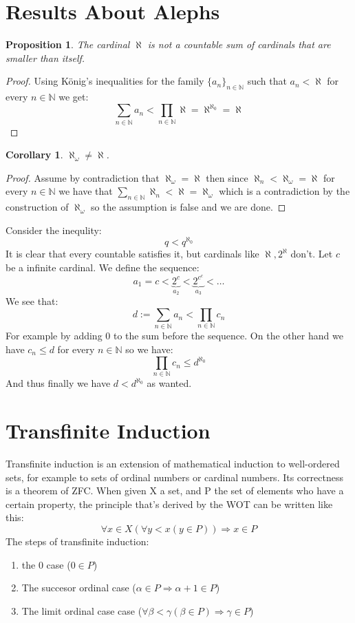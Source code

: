 \documentclass{article}
\newcommand{\N}{\mathbb{N}}
\theoremstyle{plain}
\newtheorem{proposition}[theorem]{Proposition}
\newtheorem{corollary}[theorem]{Corollary}
\begin{document}
	\section*{Results About Alephs}
	\begin{proposition}
		The cardinal $\aleph$ is not a countable sum of cardinals that are
		smaller than itself.
	\end{proposition}
	\begin{proof}
		Using König's inequalities for the family $\{a_n\}_{n \in \N}$ such
		that $a_n < \aleph$ for every $n \in \N$ we get:
		\[
			\sum_{n\in\N}{a_n} < \prod_{n\in\N}{\aleph} = \aleph^{\aleph_0}
			= \aleph
		\]
	\end{proof}
	\begin{corollary}
		$\aleph_\omega \neq \aleph$.
	\end{corollary}
	\begin{proof}
		Assume by contradiction that $\aleph_\omega = \aleph$ then since
		$\aleph_n < \aleph_\omega = \aleph $ for every $n \in \N$ we have 
		that $\sum_{n\in\N}{\aleph_n} < \aleph = \aleph_\omega$ which is
		a contradiction by the construction of $\aleph_\omega$ so the
		assumption is false and we are done.
	\end{proof}
	\noindent Consider the inequlity:
	\[
		q < q^{\aleph_0}
	\]
	It is clear that every countable satisfies it, but cardinals like
	$\aleph,2^\aleph$ don't. Let $c$ be a infinite cardinal. We define
	the sequence:
	\[
		a_1 = c < \underbrace{2^c}_{a_2} < \underbrace{2^{c^c}}_{a_3} < \dots
	\]
	We see that:
	\[
		d := \sum_{n \in \N}{a_n} < \prod_{n \in \N}{c_n}
	\]
	For example by adding $0$ to the sum before the sequence. On the other
	hand we have $c_n \le d$ for every $n \in \N$ so we have:
	\[
		\prod_{n \in \N}{c_n} \le d^{\aleph_0}
	\]
	And thus finally we have $d < d^{\aleph_0}$ as wanted.

\newpage
\section{Transfinite Induction}
Transfinite induction is an extension of mathematical induction to well-ordered
sets, for example to sets of ordinal numbers or cardinal numbers. Its 
correctness is a theorem of ZFC. When given X a set, and P the set of 
elements who have a certain property, the principle that’s derived by the 
WOT can be written like this:
\[
	\forall x\in X(\forall y<x(y\in P)) \Rightarrow x\in P
\]
The steps of transfinite induction:
\begin{enumerate}
\item the 0 case ($0\in P$)
\item The succesor ordinal case ($\alpha\in P \Rightarrow \alpha+1\in P$)
\item The limit ordinal case case ($\forall\beta<\gamma(\beta\in P)\Rightarrow 
\gamma\in P$)
\end{enumerate}
\end{document}
